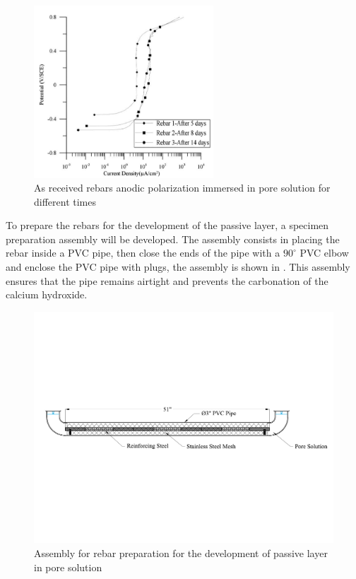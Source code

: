 \begin{figure}[htbp]
	\centering
	\includegraphics[width=0.6\textwidth]{Chapter-3/figs/AsReceived_AnodicPolarization_time}
	\caption{As received rebars anodic polarization immersed in pore solution for different times\cite{Ghods2009}}
	\label{fig:GhodsRebarPassivation}
\end{figure}

To prepare the rebars for the development of the passive layer, a specimen preparation assembly will be developed. The assembly consists in placing the rebar inside a PVC pipe, then close the ends of the pipe  with a $90^{\circ}$ PVC elbow and enclose the PVC pipe with plugs, the assembly is shown in . This assembly ensures that the pipe remains airtight and prevents the carbonation of the calcium hydroxide.

\begin{figure}[htbp]
	\centering
	\includegraphics[width=1.0\textwidth]{Chapter-3/figs/AnodicPolarization_01}
	\caption{Assembly for rebar preparation for the development of passive layer in pore solution}
	\label{fig:RebarPassivation}
\end{figure}

